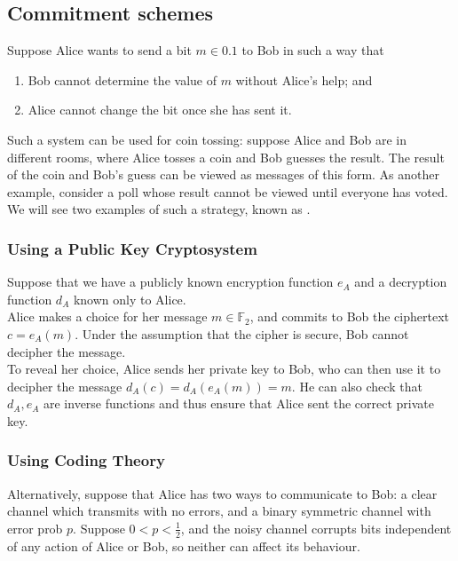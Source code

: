 \subsection{Commitment schemes}
Suppose Alice wants to send a bit $m \in \qty{0,1}$ to Bob in such a way that
\begin{enumerate}
    \item Bob cannot determine the value of $m$ without Alice's help; and
    \item Alice cannot change the bit once she has sent it.
\end{enumerate}
Such a system can be used for coin tossing: suppose Alice and Bob are in different rooms, where Alice tosses a coin and Bob guesses the result.
The result of the coin and Bob's guess can be viewed as messages of this form.
As another example, consider a poll whose result cannot be viewed until everyone has voted.
We will see two examples of such a  strategy, known as .

\subsubsection{Using a Public Key Cryptosystem}
Suppose that we have a publicly known encryption function $e_A$ and a decryption function $d_A$ known only to Alice. \\
Alice makes a choice for her message $m \in \mathbb{F}_2$, and commits to Bob the ciphertext $c = e_A(m)$.
Under the assumption that the cipher is secure, Bob cannot decipher the message. \\
To reveal her choice, Alice sends her private key to Bob, who can then use it to decipher the message $d_A(c) = d_A(e_A(m)) = m$.
He can also check that $d_A, e_A$ are inverse functions and thus ensure that Alice sent the correct private key.

\subsubsection{Using Coding Theory}
Alternatively, suppose that Alice has two ways to communicate to Bob: a clear channel which transmits with no errors, and a binary symmetric channel with error prob $p$.
Suppose $0 < p < \frac{1}{2}$, and the noisy channel corrupts bits independent of any action of Alice or Bob, so neither can affect its behaviour.

